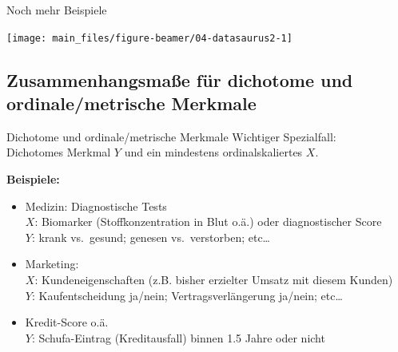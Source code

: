 \documentclass[
  10pt,
  ignorenonframetext,
]{beamer}
\begin{document}
\begin{frame}{Noch mehr Beispiele}
\label{noch-mehr-beispiele}
\scriptsize

\begin{center}\texttt{[image: main\_files/figure-beamer/04-datasaurus2-1]} \end{center}

\normalsize
\end{frame}

\subsection{Zusammenhangsmaße für dichotome und ordinale/metrische
Merkmale}\label{zusammenhangsmauxdfe-fuxfcr-dichotome-und-ordinalemetrische-merkmale}

\begin{frame}{Dichotome und ordinale/metrische Merkmale}
\label{dichotome-und-ordinalemetrische-merkmale}
Wichtiger Spezialfall:\\
Dichotomes Merkmal \(Y\) und ein mindestens ordinalskaliertes \(X\).

\textbf{Beispiele:}

\begin{itemize}
\item
  Medizin: Diagnostische Tests\\
  \(X\): Biomarker (Stoffkonzentration in Blut o.ä.) oder diagnostischer
  Score\\
  \(Y\): krank vs.~gesund; genesen vs.~verstorben; etc\ldots{}
\item
  Marketing:\\
  \(X\): Kundeneigenschaften (z.B. bisher erzielter Umsatz mit diesem
  Kunden)\\
  \(Y\): Kaufentscheidung ja/nein; Vertragsverlängerung ja/nein;
  etc\ldots{}
\item
  Kredit-Score o.ä.\\
  \(Y\): Schufa-Eintrag (Kreditausfall) binnen 1.5 Jahre oder nicht
\end{itemize}
\end{frame}
\end{document}
